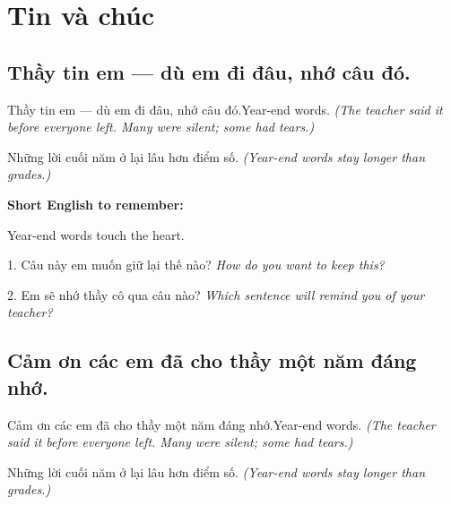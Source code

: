 \chapter{Tin và chúc}


\section{Thầy tin em — dù em đi đâu, nhớ câu đó.}
\begin{truyen}{Thầy tin em — dù em đi đâu, nhớ câu đó.}{Year-end words.}
\textit{(The teacher said it before everyone left. Many were silent; some had tears.)}
\end{truyen}

\begin{baihoc}
Những lời cuối năm ở lại lâu hơn điểm số.
\textit{(Year-end words stay longer than grades.)}
\end{baihoc}

\begin{ghinhoanh}
\textbf{Short English to remember:}

Year-end words touch the heart.

\end{ghinhoanh}

\begin{tuhocnhanh}
1. Câu này em muốn giữ lại thế nào? \textit{How do you want to keep this?}

2. Em sẽ nhớ thầy cô qua câu nào? \textit{Which sentence will remind you of your teacher?}
\end{tuhocnhanh}
\ngancach


\section{Cảm ơn các em đã cho thầy một năm đáng nhớ.}
\begin{truyen}{Cảm ơn các em đã cho thầy một năm đáng nhớ.}{Year-end words.}
\textit{(The teacher said it before everyone left. Many were silent; some had tears.)}
\end{truyen}

\begin{baihoc}
Những lời cuối năm ở lại lâu hơn điểm số.
\textit{(Year-end words stay longer than grades.)}
\end{baihoc}

